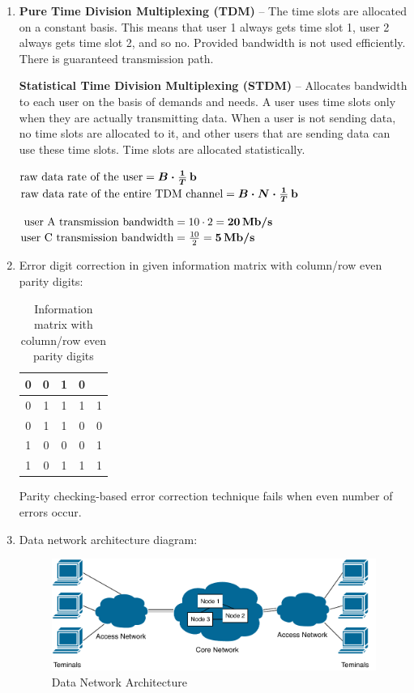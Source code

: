 \documentclass[a4paper, 11pt]{article}
\begin{document}
	\begin{enumerate}
		\item %
			\textbf{Pure Time Division Multiplexing (TDM)} -- The time slots are allocated on a constant basis.
			This means that user 1 always gets time slot 1, user 2 always gets time slot 2, and so no.
			Provided bandwidth is not used efficiently. There is guaranteed transmission path.

			\textbf{Statistical Time Division Multiplexing (STDM)} -- Allocates bandwidth to each user on the basis
			of demands and needs. A user uses time slots only when they are actually transmitting data.
			When a user is not sending data, no time slots are allocated to it, and other users that
			are sending data can use these time slots. Time slots are allocated statistically.

			$ \text{raw data rate of the user} = \boldsymbol{B \cdot \frac{1}{T}\,\text{\textbf{b}}} $ \\
			$ \text{raw data rate of the entire TDM channel} = \boldsymbol{B \cdot N \cdot \frac{1}{T}\,\text{\textbf{b}}} $

			$ \text{user A transmission bandwidth} = 10 \cdot 2 = \boldsymbol{20\,\text{\textbf{Mb/s}}} $ \\
			$ \text{user C transmission bandwidth} = \frac{10}{2} = \boldsymbol{5\,\text{\textbf{Mb/s}}} $

		\item %
			Error digit correction in given information matrix with column/row even parity digits:
			\begin{table}[H]
				\centering
				\begin{tabular}{c c c c | c}
					0 & 0 & 1 & 0 & \\ \hline
					0 & {\color{red} 1} & 1 & 1 & 1 \\
					0 & 1 & 1 & 0 & 0 \\
					1 & 0 & 0 & 0 & 1 \\
					1 & 0 & 1 & 1 & 1 \\
				\end{tabular}
				\caption{Information matrix with column/row even parity digits}
				\label{table:information_parity_matrix}
			\end{table}

			Parity checking-based error correction technique fails when even number of errors occur.

		\item %
			Data network architecture diagram:
			\begin{figure}[H]
				\centering
				\includegraphics[width=0.7\linewidth]{inc/data_network_architecture.pdf}
				\caption{Data Network Architecture}
				\label{figure:data_network_architecture}
			\end{figure}


\end{enumerate}
\end{document}
